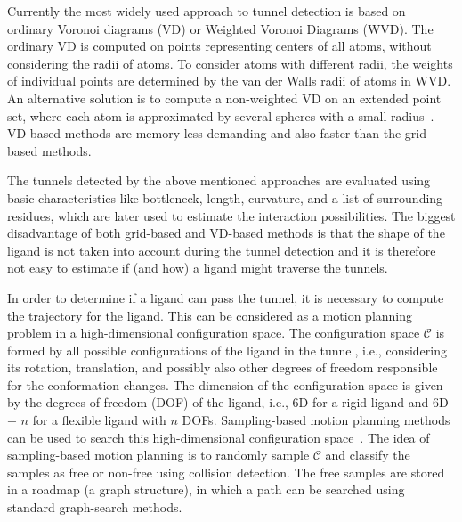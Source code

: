\documentclass{svmult}
\def\C{\mathcal{C}}
\begin{document}
Currently the most widely used approach to tunnel detection is based on ordinary Voronoi diagrams (VD) or Weighted Voronoi Diagrams (WVD).
The ordinary VD is computed on points representing centers of all atoms, without considering the radii of atoms.
To consider atoms with different radii, the weights of individual points are determined by the van der Walls radii of atoms in WVD.
An alternative solution is to compute a non-weighted VD on an extended point set, where 
each atom is approximated by several spheres with a small radius~\cite{yaffe2008,caver3}.
VD-based methods are memory less demanding and also faster than the grid-based methods.

The tunnels detected by the above mentioned approaches are evaluated using basic characteristics like bottleneck, length, curvature, and a list of surrounding
residues, which are later used to estimate the interaction possibilities.
The biggest disadvantage of both grid-based and VD-based methods is that the shape of the ligand is not taken into account during the tunnel detection and it is therefore not easy to estimate if (and how) a ligand might traverse the tunnels.

In order to determine if a ligand can pass the tunnel, it is necessary to compute the trajectory for the ligand.
This can be considered as a motion planning problem in a high-dimensional configuration space.
The configuration space $\C$ is formed by all possible configurations of the ligand in the tunnel, i.e., considering its rotation, translation, and possibly also other degrees of freedom responsible for the conformation changes.
The dimension of the configuration space is given by the degrees of freedom (DOF) of the ligand, i.e., 6D for a rigid ligand and 6D + $n$ for a flexible
ligand with $n$ DOFs.
Sampling-based motion planning methods can be used to search this high-dimensional configuration space~\cite{Lav06}.
The idea of sampling-based motion planning is to randomly sample $\C$ and classify the samples as free or non-free using collision detection.
The free samples are stored in a roadmap (a graph structure), in which a path can be searched using standard graph-search methods.
\end{document}
